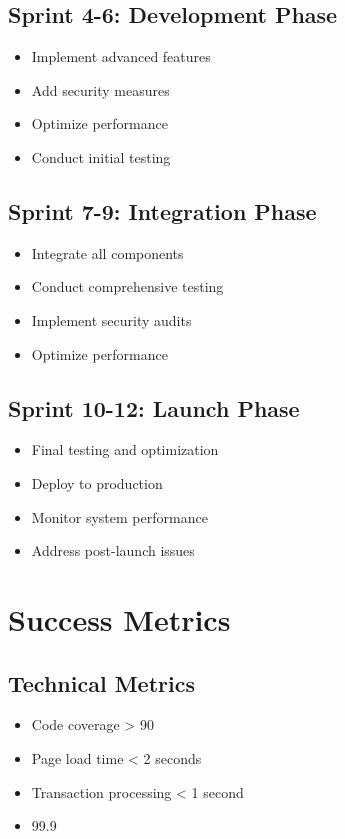 \documentclass{article}
\begin{document}
\subsection*{Sprint 4-6: Development Phase}
\begin{itemize}
    \item Implement advanced features
    \item Add security measures
    \item Optimize performance
    \item Conduct initial testing
\end{itemize}

\subsection*{Sprint 7-9: Integration Phase}
\begin{itemize}
    \item Integrate all components
    \item Conduct comprehensive testing
    \item Implement security audits
    \item Optimize performance
\end{itemize}

\subsection*{Sprint 10-12: Launch Phase}
\begin{itemize}
    \item Final testing and optimization
    \item Deploy to production
    \item Monitor system performance
    \item Address post-launch issues
\end{itemize}

\section*{Success Metrics}

\subsection*{Technical Metrics}
\begin{itemize}
    \item Code coverage > 90\\%
    \item Page load time < 2 seconds
    \item Transaction processing < 1 second
    \item 99.9\\%
\end{itemize}
\end{document}
